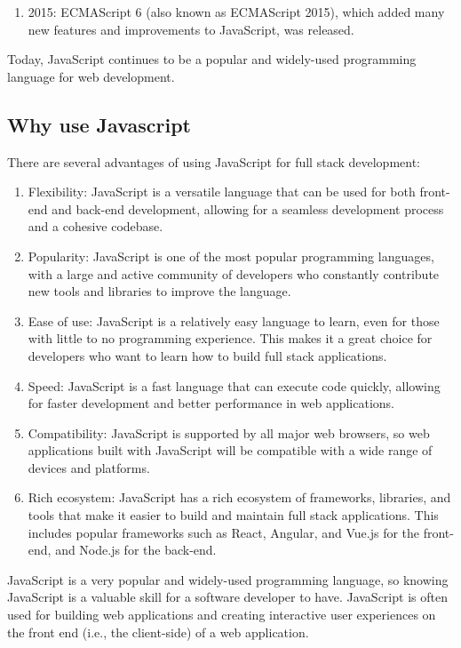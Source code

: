 {\begin{enumerate}
\item  2015: ECMAScript 6 (also known as ECMAScript 2015), which added many new features and improvements to JavaScript, was released.


\end{enumerate}
Today, JavaScript continues to be a popular and widely-used programming language for web development.
\subsection{Why use Javascript}

There are several advantages of using JavaScript for full stack development:

\begin{enumerate}
\item Flexibility: JavaScript is a versatile language that can be used for both front-end and back-end development, allowing for a seamless development process and a cohesive codebase.

\item  Popularity: JavaScript is one of the most popular programming languages, with a large and active community of developers who constantly contribute new tools and libraries to improve the language.

\item  Ease of use: JavaScript is a relatively easy language to learn, even for those with little to no programming experience. This makes it a great choice for developers who want to learn how to build full stack applications.

\item  Speed: JavaScript is a fast language that can execute code quickly, allowing for faster development and better performance in web applications.

\item Compatibility: JavaScript is supported by all major web browsers, so web applications built with JavaScript will be compatible with a wide range of devices and platforms.

\item  Rich ecosystem: JavaScript has a rich ecosystem of frameworks, libraries, and tools that make it easier to build and maintain full stack applications. This includes popular frameworks such as React, Angular, and Vue.js for the front-end, and Node.js for the back-end.
\end{enumerate}


JavaScript is a very popular and widely-used programming language, so knowing JavaScript is a valuable skill for a software developer to have. JavaScript is often used for building web applications and creating interactive user experiences on the front end (i.e., the client-side) of a web application.

}
